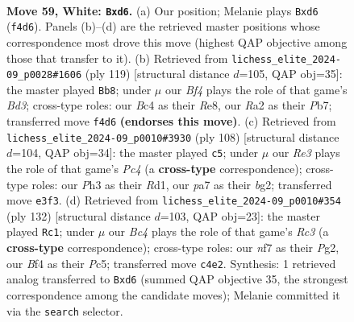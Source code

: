 \documentclass[11pt]{article}
\begin{document}
\clearpage

\begin{figure}[p]\centering
\begin{subfigure}{0.46\textwidth}\centering
\resizebox{\linewidth}{!}{%
\newchessgame
\chessboard[
  setfen={7r/p4nkp/P2b4/2r5/2B2B2/1Pp1R1KP/R1P3P1/8 w - - 25 59},
  showmover=false,
  pgfstyle=straightmove, color=movearrow, markmove={f4-d6}
]}
\caption{}
\end{subfigure}\hfill
\begin{subfigure}{0.46\textwidth}\centering
\resizebox{\linewidth}{!}{%
\newchessgame
\chessboard[
  setfen={4r3/1p1r2pk/1B1b3p/1b5P/3R1PP1/4PN2/5K2/2R5 b - - 7 60},
  showmover=false,
  pgfstyle=straightmove, color=movearrow, markmove={d6-b8}
]}
\caption{}
\end{subfigure}
\\[4pt]
\begin{subfigure}{0.46\textwidth}\centering
\resizebox{\linewidth}{!}{%
\newchessgame
\chessboard[
  setfen={2r5/p1P5/3B4/R3Nr1k/1KP1np2/1P5p/P5bP/3R4 w - - 1 55},
  showmover=false,
  pgfstyle=straightmove, color=movearrow, markmove={c4-c5}
]}
\caption{}
\end{subfigure}\hfill
\begin{subfigure}{0.46\textwidth}\centering
\resizebox{\linewidth}{!}{%
\newchessgame
\chessboard[
  setfen={8/1p3kp1/8/1bP4p/p4K1P/P1RrBP2/1P4P1/8 w - - 68 67},
  showmover=false,
  pgfstyle=straightmove, color=movearrow, markmove={c3-c1}
]}
\caption{}
\end{subfigure}
\caption{\textbf{Move 59, White: \texttt{Bxd6}.} (a) Our position; Melanie plays \texttt{Bxd6} (\texttt{f4d6}). Panels (b)--(d) are the retrieved master positions whose correspondence most drove this move (highest QAP objective among those that transfer to it). (b) Retrieved from \texttt{lichess\_elite\_2024-09\_p0028\#1606} (ply 119) [structural distance $d$=105, QAP obj=35]: the master played \texttt{Bb8}; under $\mu$ our \emph{Bf4} plays the role of that game's \emph{Bd3}; cross-type roles: our \emph{B}c4 as their \emph{R}e8, our \emph{R}a2 as their \emph{P}b7; transferred move \texttt{f4d6} \textbf{(endorses this move)}. (c) Retrieved from \texttt{lichess\_elite\_2024-09\_p0010\#3930} (ply 108) [structural distance $d$=104, QAP obj=34]: the master played \texttt{c5}; under $\mu$ our \emph{Re3} plays the role of that game's \emph{Pc4} (a \textbf{cross-type} correspondence); cross-type roles: our \emph{P}h3 as their \emph{R}d1, our \emph{p}a7 as their \emph{b}g2; transferred move \texttt{e3f3}. (d) Retrieved from \texttt{lichess\_elite\_2024-09\_p0010\#354} (ply 132) [structural distance $d$=103, QAP obj=23]: the master played \texttt{Rc1}; under $\mu$ our \emph{Bc4} plays the role of that game's \emph{Rc3} (a \textbf{cross-type} correspondence); cross-type roles: our \emph{n}f7 as their \emph{P}g2, our \emph{B}f4 as their \emph{P}c5; transferred move \texttt{c4e2}. Synthesis: 1 retrieved analog transferred to \texttt{Bxd6} (summed QAP objective 35, the strongest correspondence among the candidate moves); Melanie committed it via the \texttt{search} selector.}
\label{fig:thought-m116}
\end{figure}
\end{document}

